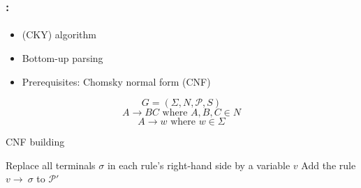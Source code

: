 \documentclass[xcolor=table]{beamer}
\begin{document}
\begin{frame}
	\frametitle{\insertshortsubtitle: \insertsection}
	\framesubtitle{\insertsubsection}

	\begin{itemize}
		\item {} (CKY) algorithm
		\item Bottom-up parsing
		\item Prerequisites: Chomsky normal form (CNF)
	\end{itemize}
	
	\begin{minipage}{.4\textwidth}
		\begin{definition}[CNF]
			\[G = (\Sigma, N, \mathcal{P}, S)\]
			\[A \rightarrow  B C \text{ where } A, B, C \in N\]
			\[A \rightarrow w \text{ where } w \in \Sigma\]
		\end{definition}
	\end{minipage}
	\begin{minipage}{.56\textwidth}
		\begin{block}{CNF building}
		\tiny
		\begin{algorithm}[H]
			
			Replace all terminals $\sigma$ in each rule's right-hand side by a variable $v$\;
			Add the rule $v \rightarrow\ \sigma$ to $\mathcal{P}'$\;
		\end{algorithm}
		\end{block}
	\end{minipage}

\end{frame}
\end{document}
